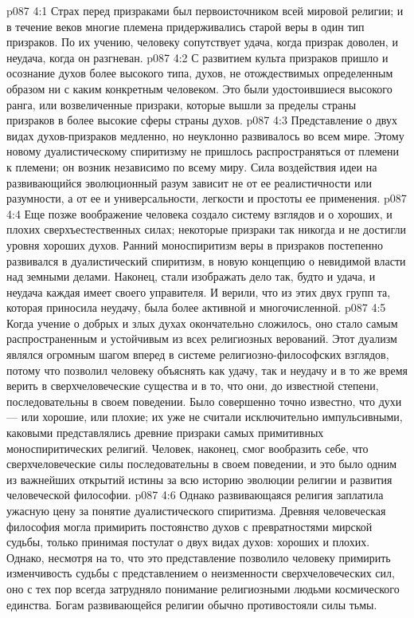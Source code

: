 \vs p087 4:1 Страх перед призраками был первоисточником всей мировой религии; и в течение веков многие племена придерживались старой веры в один тип призраков. По их учению, человеку сопутствует удача, когда призрак доволен, и неудача, когда он разгневан.
\vs p087 4:2 С развитием культа призраков пришло и осознание духов более высокого типа, духов, не отождествимых определенным образом ни с каким конкретным человеком. Это были удостоившиеся высокого ранга, или возвеличенные призраки, которые вышли за пределы страны призраков в более высокие сферы страны духов.
\vs p087 4:3 Представление о двух видах духов\hyp{}призраков медленно, но неуклонно развивалось во всем мире. Этому новому дуалистическому спиритизму не пришлось распространяться от племени к племени; он возник независимо по всему миру. Сила воздействия идеи на развивающийся эволюционный разум зависит не от ее реалистичности или разумности, а от ее  и универсальности, легкости и простоты ее применения.
\vs p087 4:4 Еще позже воображение человека создало систему взглядов и о хороших, и плохих сверхъестественных силах; некоторые призраки так никогда и не достигли уровня хороших духов. Ранний моноспиритизм веры в призраков постепенно развивался в дуалистический спиритизм, в новую концепцию о невидимой власти над земными делами. Наконец, стали изображать дело так, будто и удача, и неудача каждая имеет своего управителя. И верили, что из этих двух групп та, которая приносила неудачу, была более активной и многочисленной.
\vs p087 4:5 \pc Когда учение о добрых и злых духах окончательно сложилось, оно стало самым распространенным и устойчивым из всех религиозных верований. Этот дуализм являлся огромным шагом вперед в системе религиозно\hyp{}философских взглядов, потому что позволил человеку объяснять как удачу, так и неудачу и в то же время верить в сверхчеловеческие существа и в то, что они, до известной степени, последовательны в своем поведении. Было совершенно точно известно, что духи --- или хорошие, или плохие; их уже не считали исключительно импульсивными, каковыми представлялись древние призраки самых примитивных моноспиритических религий. Человек, наконец, смог вообразить себе, что сверхчеловеческие силы последовательны в своем поведении, и это было одним из важнейших открытий истины за всю историю эволюции религии и развития человеческой философии.
\vs p087 4:6 Однако развивающаяся религия заплатила ужасную цену за понятие дуалистического спиритизма. Древняя человеческая философия могла примирить постоянство духов с превратностями мирской судьбы, только принимая постулат о двух видах духов: хороших и плохих. Однако, несмотря на то, что это представление позволило человеку примирить изменчивость судьбы с представлением о неизменности сверхчеловеческих сил, оно с тех пор всегда затрудняло понимание религиозными людьми космического единства. Богам развивающейся религии обычно противостояли силы тьмы.
